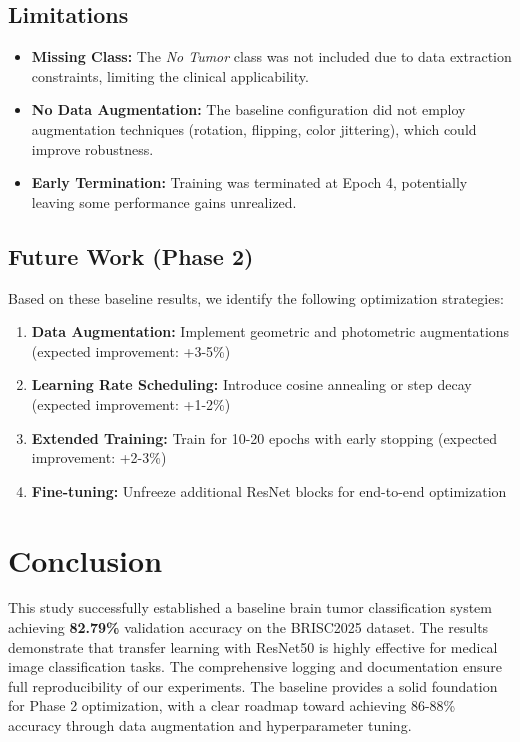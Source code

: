 \documentclass[11pt,a4paper]{article}
\begin{document}
\subsection{Limitations}
\begin{itemize}
    \item \textbf{Missing Class:} The \textit{No Tumor} class was not included due to data extraction constraints, limiting the clinical applicability.
    
    \item \textbf{No Data Augmentation:} The baseline configuration did not employ augmentation techniques (rotation, flipping, color jittering), which could improve robustness.
    
    \item \textbf{Early Termination:} Training was terminated at Epoch 4, potentially leaving some performance gains unrealized.
\end{itemize}

\subsection{Future Work (Phase 2)}

Based on these baseline results, we identify the following optimization strategies:

\begin{enumerate}
    \item \textbf{Data Augmentation:} Implement geometric and photometric augmentations (expected improvement: +3-5\%)
    \item \textbf{Learning Rate Scheduling:} Introduce cosine annealing or step decay (expected improvement: +1-2\%)
    \item \textbf{Extended Training:} Train for 10-20 epochs with early stopping (expected improvement: +2-3\%)
    \item \textbf{Fine-tuning:} Unfreeze additional ResNet blocks for end-to-end optimization
\end{enumerate}

\section{Conclusion}

This study successfully established a baseline brain tumor classification system achieving \textbf{82.79\%} validation accuracy on the BRISC2025 dataset. The results demonstrate that transfer learning with ResNet50 is highly effective for medical image classification tasks. The comprehensive logging and documentation ensure full reproducibility of our experiments. The baseline provides a solid foundation for Phase 2 optimization, with a clear roadmap toward achieving 86-88\% accuracy through data augmentation and hyperparameter tuning.
\end{document}
